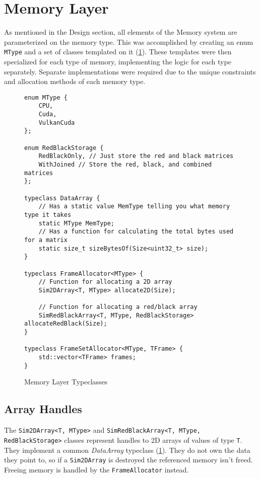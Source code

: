 \section{Memory Layer}
As mentioned in the Design section, all elements of the Memory system are parameterized on the memory type.
This was accomplished by creating an enum \texttt{MType} and a set of classes templated on it (\cref{fig:TypeclassMemory}).
These templates were then specialized for each type of memory, implementing the logic for each type separately.
Separate implementations were required due to the unique constraints and allocation methods of each memory type.

\begin{figure}
    \centering
\begin{verbatim}
enum MType {
    CPU,
    Cuda,
    VulkanCuda
};

enum RedBlackStorage {
    RedBlackOnly, // Just store the red and black matrices
    WithJoined // Store the red, black, and combined matrices
};

typeclass DataArray {
    // Has a static value MemType telling you what memory type it takes
    static MType MemType;
    // Has a function for calculating the total bytes used for a matrix
    static size_t sizeBytesOf(Size<uint32_t> size);
}

typeclass FrameAllocator<MType> {
    // Function for allocating a 2D array
    Sim2DArray<T, MType> allocate2D(Size);
    
    // Function for allocating a red/black array
    SimRedBlackArray<T, MType, RedBlackStorage> allocateRedBlack(Size);
}

typeclass FrameSetAllocator<MType, TFrame> {
    std::vector<TFrame> frames;
}
\end{verbatim}
    \caption{Memory Layer Typeclasses}
    \label{fig:TypeclassMemory}
\end{figure}

\subsection{Array Handles}
The \texttt{Sim2DArray<T, MType>} and \texttt{SimRedBlackArray<T, MType, RedBlackStorage>} classes represent handles to 2D arrays of values of type \texttt{T}.
They implement a common \emph{DataArray} typeclass (\cref{fig:TypeclassMemory}).
They do not own the data they point to, so if a \texttt{Sim2DArray} is destroyed the referenced memory isn't freed.
Freeing memory is handled by the \texttt{FrameAllocator} instead.

